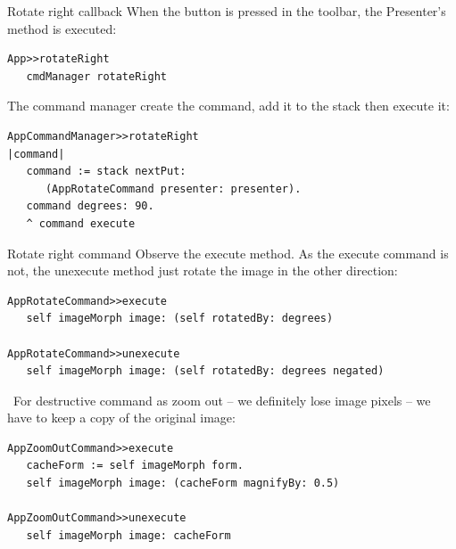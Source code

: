 \documentclass{beamer}
\newcommand{\tip}{\boldmath{\textcolor{red}{$\Rightarrow$}}}
\begin{document}
\begin{frame}[fragile]{Rotate right callback}
  When the button is pressed in the toolbar, the Presenter's method is
  executed:
\fontsize{10pt}{8pt}\selectfont

 \begin{lstlisting}[language=Smalltalk]
App>>rotateRight
   cmdManager rotateRight 
 \end{lstlisting}
 The command manager create the command, add it to the stack then
 execute it:
 \begin{lstlisting}[language=Smalltalk]
AppCommandManager>>rotateRight
|command|
   command := stack nextPut:
      (AppRotateCommand presenter: presenter).
   command degrees: 90.
   ^ command execute
 \end{lstlisting}
\end{frame}
%
\begin{frame}[fragile]{Rotate right command}
  Observe the execute method. As the execute command is not, the
  unexecute method just rotate the image in the other direction:

  \fontsize{10pt}{8pt}\selectfont

 \begin{lstlisting}[language=Smalltalk]
AppRotateCommand>>execute
   self imageMorph image: (self rotatedBy: degrees)

AppRotateCommand>>unexecute
   self imageMorph image: (self rotatedBy: degrees negated)   
 \end{lstlisting}
 
  \fontsize{11pt}{8pt}\selectfont
\tip\  For destructive command as zoom out -- we definitely lose image
 pixels -- we have to keep a copy of the original image:
  \fontsize{10pt}{8pt}\selectfont
  \begin{lstlisting}[language=Smalltalk]
AppZoomOutCommand>>execute
   cacheForm := self imageMorph form.
   self imageMorph image: (cacheForm magnifyBy: 0.5)

AppZoomOutCommand>>unexecute
   self imageMorph image: cacheForm   
\end{lstlisting}

\end{frame}
\end{document}
